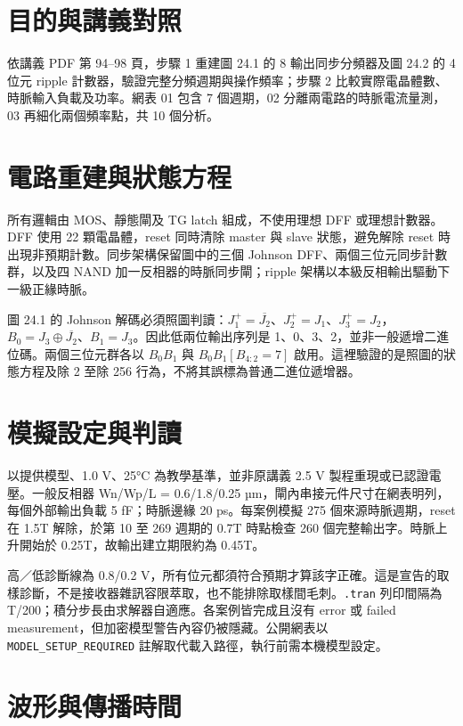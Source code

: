 \section{目的與講義對照}

依講義 PDF 第 94--98 頁，步驟 1 重建圖 24.1 的 8 輸出同步分頻器及圖 24.2 的 4 位元 ripple 計數器，驗證完整分頻週期與操作頻率；步驟 2 比較實際電晶體數、時脈輸入負載及功率。網表 01 包含 7 個週期，02 分離兩電路的時脈電流量測，03 再細化兩個頻率點，共 10 個分析。

\section{電路重建與狀態方程}

所有邏輯由 MOS、靜態閘及 TG latch 組成，不使用理想 DFF 或理想計數器。DFF 使用 22 顆電晶體，reset 同時清除 master 與 slave 狀態，避免解除 reset 時出現非預期計數。同步架構保留圖中的三個 Johnson DFF、兩個三位元同步計數群，以及四 NAND 加一反相器的時脈同步閘；ripple 架構以本級反相輸出驅動下一級正緣時脈。

圖 24.1 的 Johnson 解碼必須照圖判讀：$J_1^+=\overline{J_2}$、$J_2^+=J_1$、$J_3^+=J_2$，$B_0=J_3\oplus\overline{J_2}$、$B_1=J_3$。因此低兩位輸出序列是 1、0、3、2，並非一般遞增二進位碼。兩個三位元群各以 $B_0B_1$ 與 $B_0B_1[B_{4:2}=7]$ 啟用。這裡驗證的是照圖的狀態方程及除 2 至除 256 行為，不將其誤標為普通二進位遞增器。

\section{模擬設定與判讀}

以提供模型、1.0 V、25°C 為教學基準，並非原講義 2.5 V 製程重現或已認證電壓。一般反相器 Wn/Wp/L = 0.6/1.8/0.25 µm，閘內串接元件尺寸在網表明列，每個外部輸出負載 5 fF；時脈邊緣 20 ps。每案例模擬 275 個來源時脈週期，reset 在 1.5T 解除，於第 10 至 269 週期的 0.7T 時點檢查 260 個完整輸出字。時脈上升開始於 0.25T，故輸出建立期限約為 0.45T。

高／低診斷線為 0.8/0.2 V，所有位元都須符合預期才算該字正確。這是宣告的取樣診斷，不是接收器雜訊容限萃取，也不能排除取樣間毛刺。\texttt{.tran} 列印間隔為 T/200；積分步長由求解器自適應。各案例皆完成且沒有 error 或 failed measurement，但加密模型警告內容仍被隱藏。公開網表以 \texttt{MODEL\_SETUP\_REQUIRED} 註解取代載入路徑，執行前需本機模型設定。

\section{波形與傳播時間}

